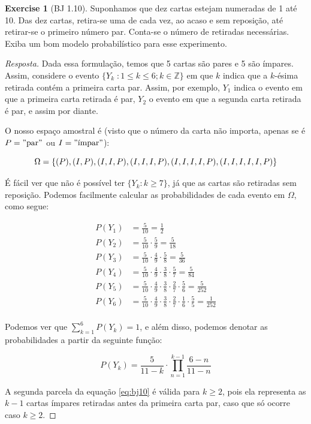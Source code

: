 \documentclass[
]{article}
\theoremstyle{definition}
\theoremstyle{definition}
\theoremstyle{definition}
\newtheorem{exercise}{Exercise}[section]
\theoremstyle{definition}
\theoremstyle{remark}
\begin{document}
\begin{exercise}[BJ 1.10]

Suponhamos que dez cartas estejam numeradas de 1 até 10. Das dez cartas, retira-se uma de cada vez, ao acaso e sem reposição, até retirar-se o primeiro número par. Conta-se o número de retiradas necessárias. Exiba um bom modelo probabilístico para esse experimento.

\begin{proof}[Resposta]
Dada essa formulação, temos que 5 cartas são pares e 5 são ímpares. Assim, considere o evento \(\{Y_{k} \;: 1 \le k \le 6 ; k \in \mathbb{Z}\}\) em que \(k\) indica que a \(k\)-ésima retirada contém a primeira carta par. Assim, por exemplo, \(Y_{1}\) indica o evento em que a primeira carta retirada é par, \(Y_{2}\) o evento em que a segunda carta retirada é par, e assim por diante.

O nosso espaço amostral é (visto que o número da carta não importa, apenas se é \(P = "\text{par}"\) ou \(I = "\text{ímpar}"\)):

\begin{equation*}
\Omega = \{(P), (I,P), (I,I,P), (I,I,I,P), (I,I,I,I,P), (I,I,I,I,I,P)\}\\
\end{equation*}

É fácil ver que não é possível ter \(\{Y_{k} : k \ge 7\}\), já que as cartas são retiradas sem reposição. Podemos facilmente calcular as probabilidades de cada evento em \(\Omega\), como segue:

\begin{align*}
P(Y_{1}) &= \frac{5}{10} = \frac{1}{2}\\
P(Y_{2}) &= \frac{5}{10} \cdot \frac{5}{9}  = \frac{5}{18}\\
P(Y_{3}) &= \frac{5}{10} \cdot \frac{4}{9} \cdot \frac{5}{8} = \frac{5}{36}\\
P(Y_{4}) &= \frac{5}{10} \cdot \frac{4}{9} \cdot \frac{3}{8} \cdot \frac{5}{7} = \frac{5}{84}\\
P(Y_{5}) &= \frac{5}{10} \cdot \frac{4}{9} \cdot \frac{3}{8} \cdot \frac{2}{7} \cdot \frac{5}{6} = \frac{5}{252}\\
P(Y_{6}) &= \frac{5}{10} \cdot \frac{4}{9} \cdot \frac{3}{8} \cdot \frac{2}{7} \cdot \frac{1}{6} \cdot \frac{5}{5} = \frac{1}{252}\\
\end{align*}

Podemos ver que \(\sum_{k = 1}^{6}P(Y_{k}) = 1\), e além disso, podemos denotar as probabilidades a partir da seguinte função:

\begin{equation}
P(Y_{k}) = \frac{5}{11-k} \cdot \prod_{n=1}^{k-1} \frac{6-n}{11-n}
\label{eq:bj10}
\end{equation}

A segunda parcela da equação \eqref{eq:bj10} é válida para \(k \ge 2\), pois ela representa as \(k-1\) cartas ímpares retiradas antes da primeira carta par, caso que só ocorre caso \(k \ge 2\).
\end{proof}

\end{exercise}
\end{document}
